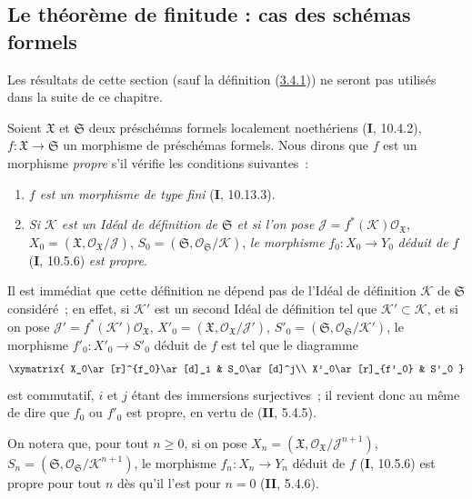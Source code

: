 \subsection{Le théorème de finitude : cas des schémas formels}
\label{subsection:III.3.4-fr}

Les résultats de cette section (sauf la définition
(\hyperref[III.3.4.1-fr]{3.4.1})) ne seront pas utilisés dans la suite de ce
chapitre.

\begin{env}[3.4.1]
\label{III.3.4.1-fr}
Soient $\mathfrak X$ et $\mathfrak S$ deux préschémas formels localement
noethériens (\textbf{I}, 10.4.2), $f:\mathfrak X\to\mathfrak S$ un morphisme de
préschémas formels. Nous dirons que $f$ est un morphisme \emph{propre} s'il
vérifie les conditions suivantes~:
\begin{enumerate}
\item[$1^\circ$] \emph{$f$ est un morphisme de type fini} (\textbf{I}, 10.13.3).
\item[$2^\circ$] \emph{Si $\mathcal K$ est un Idéal de définition de $\mathfrak S$
et si l'on pose}
$\mathcal J=f^*(\mathcal K)\mathcal O_{\mathfrak X}$,
$X_0=(\mathfrak X,\mathcal O_{\mathfrak X}/\mathcal J)$,
$S_0=(\mathfrak S,\mathcal O_{\mathfrak S}/\mathcal K)$, \emph{le morphisme}
$f_0:X_0\to Y_0$ \emph{déduit de} $f$ (\textbf{I}, 10.5.6) \emph{est propre}.
\end{enumerate}

Il est immédiat que cette définition ne dépend pas de l'Idéal de définition
$\mathcal K$ de $\mathfrak S$ considéré~; en effet, si $\mathcal K'$ est un
second Idéal de définition tel que $\mathcal K'\subset\mathcal K$, et si on
pose $\mathcal J'=f^*(\mathcal K')\mathcal O_{\mathfrak X}$,
$X'_0=(\mathfrak X,\mathcal O_{\mathfrak X}/\mathcal J')$,
$S'_0=(\mathfrak S,\mathcal O_{\mathfrak S}/\mathcal K')$, le morphisme
$f'_0:X'_0\to S'_0$ déduit de $f$ est tel que le diagramme
\[
\xymatrix{
X_0\ar[r]^{f_0}\ar[d]_i & S_0\ar[d]^j\\
X'_0\ar[r]_{f'_0} & S'_0
}
\]
est commutatif, $i$ et $j$ étant des immersions surjectives~; il revient donc
au même de dire que $f_0$ ou $f'_0$ est propre, en vertu de (\textbf{II}, 5.4.5).

On notera que, pour tout $n\geq0$, si on pose
$X_n=(\mathfrak X,\mathcal O_{\mathfrak X}/\mathcal J^{n+1})$,
$S_n=(\mathfrak S,\mathcal O_{\mathfrak S}/\mathcal K^{n+1})$, le morphisme
$f_n:X_n\to Y_n$ déduit de $f$ (\textbf{I}, 10.5.6) est propre pour tout $n$ dès qu'il
l'est pour $n=0$ (\textbf{II}, 5.4.6).


\end{env}

